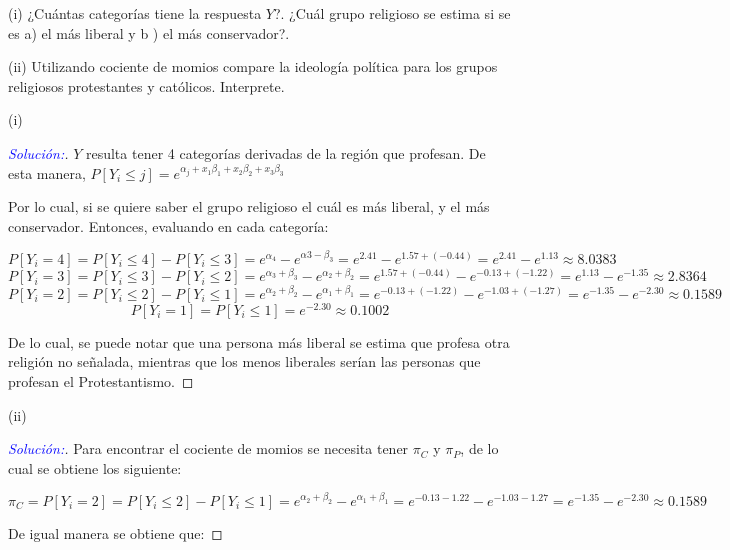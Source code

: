 \documentclass[12pt,a4paper,oneside]{article}
\begin{document}
\begin{compactenum}
\item[(i)] ¿Cuántas categorías tiene la respuesta $Y$?. ¿Cuál grupo religioso se estima si se es a) el más liberal y b ) el más conservador?.
\item[(ii)]Utilizando cociente de momios compare la ideología política para los grupos religiosos  protestantes y católicos. Interprete.\\
\end{compactenum}

\begin{compactenum}
\item[(i)]
\begin{proof}[\textcolor{blue}{Solución:}] $Y$ resulta tener 4 categorías derivadas de la región que profesan. De esta manera, $P[Y_i \leq j] = e^{\alpha_j + x_1 \beta_1 + x_2 \beta_2 + x_3 \beta_3}$

Por lo cual, si se quiere saber el grupo religioso el cuál es más liberal, y el más conservador. Entonces, evaluando en cada categoría:

$$P[Y_i = 4] = P[Y_i \leq 4] - P[Y_i \leq 3] = e^{\alpha_4} - e^{\alpha3 - \beta_3} = e^{2.41} - e^{1.57+(-0.44)} = e^{2.41} - e^{1.13} \approx 8.0383$$
$$P[Y_i = 3] = P[Y_i \leq 3] - P[Y_i \leq 2] = e^{\alpha_3 + \beta_3} - e^{\alpha_2 + \beta_2} = e^{1.57 + (-0.44)} - e^{-0.13 + (-1.22)} = e^{1.13} - e^{-1.35} \approx 2.8364$$
$$P[Y_i = 2] = P[Y_i \leq 2] - P[Y_i \leq 1] = e^{\alpha_2 + \beta_2} - e^{\alpha_1 + \beta_1} = e^{-0.13 + (-1.22)} - e^{-1.03 + (-1.27)} = e^{-1.35} - e^{-2.30} \approx 0.1589$$
$$P[Y_i = 1] = P[Y_i \leq 1] = e^{-2.30} \approx 0.1002$$

De lo cual, se puede notar que una persona más liberal se estima que profesa otra religión no señalada, mientras que los menos liberales serían las personas que profesan el Protestantismo.

\end{proof}

\item[(ii)]
\begin{proof}[\textcolor{blue}{Solución:}] Para encontrar el cociente de momios se necesita tener $\pi_C$ y $\pi_P$, de lo cual se obtiene los siguiente:

$$\pi_C = P[Y_i = 2] = P[Y_i \leq 2] - P[Y_i \leq 1] = e^{\alpha_2 + \beta_2} - e^{\alpha_1 + \beta_1} = e^{-0.13 - 1.22} - e^{-1.03 - 1.27}= e^{-1.35} - e^{-2.30} \approx 0.1589$$

De igual manera se obtiene que:


\end{proof}
\end{compactenum}
\end{document}
